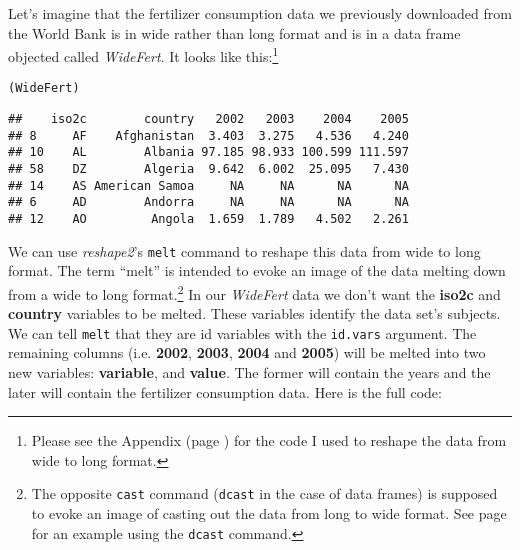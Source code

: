 Let's imagine that the fertilizer consumption data we previously downloaded from the World Bank is in wide rather than long format and is in a data frame objected called \emph{WideFert}. It looks like this:\footnote{Please see the Appendix (page \pageref{WideAppendix}) for the code I used to reshape the data from wide to long format.}







\begin{knitrout}
\color{fgcolor}\begin{kframe}
\begin{alltt}
(WideFert)
\end{alltt}
\begin{verbatim}
##    iso2c        country   2002   2003    2004    2005
## 8     AF    Afghanistan  3.403  3.275   4.536   4.240
## 10    AL        Albania 97.185 98.933 100.599 111.597
## 58    DZ        Algeria  9.642  6.002  25.095   7.430
## 14    AS American Samoa     NA     NA      NA      NA
## 6     AD        Andorra     NA     NA      NA      NA
## 12    AO         Angola  1.659  1.789   4.502   2.261
\end{verbatim}
\end{kframe}
\end{knitrout}


\noindent We can use \emph{reshape2}'s \texttt{melt}\label{MeltReshape} command to reshape this data from wide to long format. The term ``melt'' is intended to evoke an image of the data melting down from a wide to long format.\footnote{The opposite \texttt{cast} command (\texttt{dcast} in the case of data frames) is supposed to evoke an image of casting out the data from long to wide format. See page \pageref{WideAppendix} for an example using the \texttt{dcast} command.} In our \emph{WideFert} data we don't want the \textbf{iso2c} and \textbf{country} variables to be melted. These variables identify the data set's subjects. We can tell \texttt{melt} that they are id variables with the \texttt{id.vars} argument. The remaining columns (i.e. \textbf{2002}, \textbf{2003}, \textbf{2004} and \textbf{2005}) will be melted into two new variables: \textbf{variable}, and \textbf{value}. The former will contain the years and the later will contain the fertilizer consumption data. Here is the full code:

